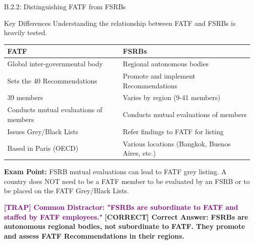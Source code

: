 \documentclass[11pt,a4paper]{beamer}
\newcommand{\trap}[1]{\textcolor{purple}{\textbf{[TRAP] #1}}}
\newcommand{\correct}[1]{\textcolor{green!50!black}{\textbf{[CORRECT] #1}}}
\begin{document}
	\begin{frame}{B.2.2: Distinguishing FATF from FSRBs}
		\begin{block}{Key Differences}
			Understanding the relationship between FATF and FSRBs is heavily tested.
		\end{block}
		\begin{tabular}{p{}|p{}}
			\hline
			\rowcolor{lightgray}
			\textbf{FATF} & \textbf{FSRBs} \\
			\hline
			Global inter-governmental body & Regional autonomous bodies \\
			Sets the 40 Recommendations & Promote and implement Recommendations \\
			39 members & Varies by region (9-41 members) \\
			Conducts mutual evaluations of members & Conducts mutual evaluations of members \\
			Issues Grey/Black Lists & Refer findings to FATF for listing \\
			Based in Paris (OECD) & Various locations (Bangkok, Buenos Aires, etc.) \\
			\hline
		\end{tabular}
		\vspace{0.2cm}
		\textbf{Exam Point:} FSRB mutual evaluations can lead to FATF grey listing. A country does NOT need to be a FATF member to be evaluated by an FSRB or to be placed on the FATF Grey/Black Lists.
		
		\trap{Common Distractor: "FSRBs are subordinate to FATF and staffed by FATF employees."}
		\correct{Correct Answer: FSRBs are autonomous regional bodies, not subordinate to FATF. They promote and assess FATF Recommendations in their regions.}
	\end{frame}
	
	
\end{document}
